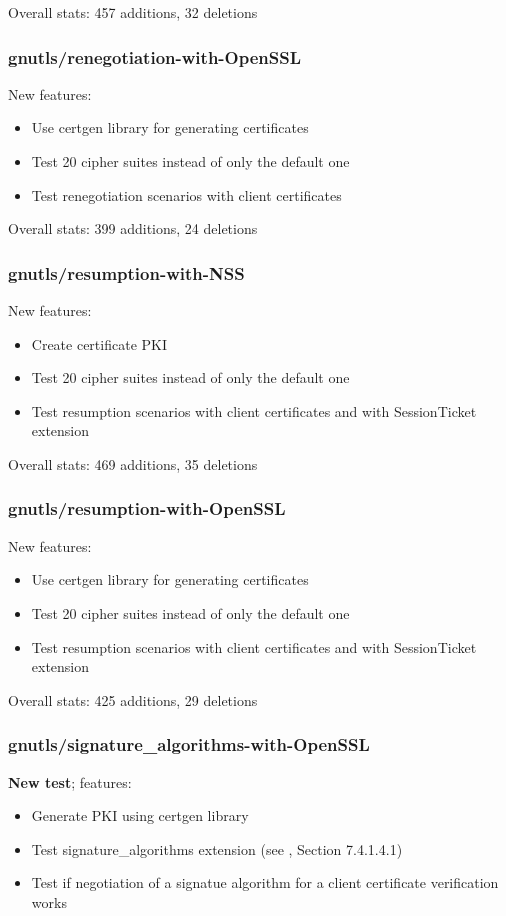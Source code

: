     \noindent Overall stats: 457 additions, 32 deletions

\subsubsection{gnutls/renegotiation-with-OpenSSL}
    New features:
    \begin{itemize}
        \item Use certgen library for generating certificates
        \item Test 20 cipher suites instead of only the default one
        \item Test renegotiation scenarios with client certificates
    \end{itemize}

    \noindent Overall stats: 399 additions, 24 deletions

\subsubsection{gnutls/resumption-with-NSS}
    New features:
    \begin{itemize}
        \item Create certificate PKI
        \item Test 20 cipher suites instead of only the default one
        \item Test resumption scenarios with client certificates and with
            SessionTicket extension
    \end{itemize}

    \noindent Overall stats: 469 additions, 35 deletions

\subsubsection{gnutls/resumption-with-OpenSSL}
    New features:
    \begin{itemize}
        \item Use certgen library for generating certificates
        \item Test 20 cipher suites instead of only the default one
        \item Test resumption scenarios with client certificates and with
            SessionTicket extension
    \end{itemize}

    \noindent Overall stats: 425 additions, 29 deletions

\subsubsection{gnutls/signature\_algorithms-with-OpenSSL}
    \textbf{New test}; features:
    \begin{itemize}
        \item Generate PKI using certgen library
        \item Test signature\_algorithms extension (see \cite{rfc5246},
            Section 7.4.1.4.1)
        \item Test if negotiation of a signatue algorithm for a client certificate
            verification works
    \end{itemize}

